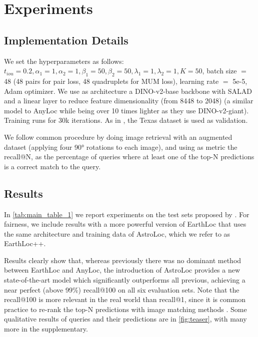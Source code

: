 



\section{Experiments}
\label{sec:experiments}

\subsection{Implementation Details}
\label{sec:Implementation_details}

We set the hyperparameters as follows: $t_{iou}=0.2, \alpha_1=1, \alpha_2=1, \beta_1=50, \beta_2=50, \lambda_1=1, \lambda_2=1, K=50$, batch size $=$ 48 (48 pairs for pair loss, 48 quadruplets for MUM loss), learning rate $=$ 5e-5, Adam optimizer.
We use as architecture a DINO-v2-base backbone \cite{Oquab_2023_dinov2} with SALAD \cite{Izquierdo_2024_SALAD} and a linear layer to reduce feature dimensionality (from 8448 to 2048) (\ie a similar model to AnyLoc \cite{Keetha_2023_AnyLoc} while being over 10 times lighter as they use DINO-v2-giant).
Training runs for 30k iterations.
As in \cite{Berton_2024_EarthLoc}, the Texas dataset is used as validation.

We follow common procedure \cite{Berton_2024_EarthLoc} by doing image retrieval with an augmented dataset (\ie applying four 90° rotations to each image),
and using as metric the recall@N, as the percentage of queries where at least one of the top-N predictions is a correct match to the query.


\subsection{Results}
In \cref{tab:main_table_1} we report experiments on the test sets proposed by \cite{Berton_2024_EarthLoc}.
For fairness, we include results with a more powerful version of EarthLoc that uses the same architecture and training data of AstroLoc, which we refer to as EarthLoc++.

Results clearly show that, whereas previously there was no dominant method between EarthLoc and AnyLoc, the introduction of AstroLoc provides a new state-of-the-art model which significantly outperforms all previous, achieving a near perfect (above 99\%) recall@100 on all six evaluation sets.
Note that the recall@100 is more relevant in the real world than recall@1, since it is common practice to re-rank the top-N predictions with image matching methods \cite{Berton_2024_EarthMatch, Stoken_2023_CVPR}.
Some qualitative results of queries and their predictions are in \cref{fig:teaser}, with many more in the supplementary.


